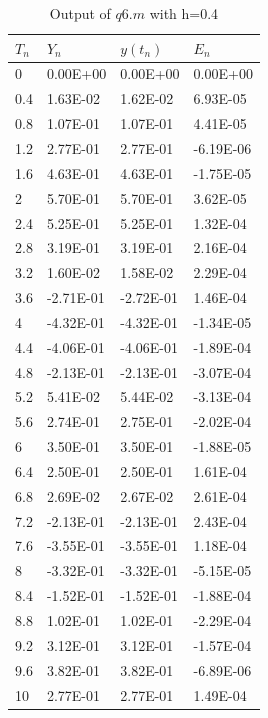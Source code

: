 \documentclass[10pt,a4paper]{report}
\begin{document}
\begin{minipage}[l]{0.45\linewidth}
\begin{table}[H]
\centering
\begin{tabular}{|l|l|l|l|}
\hline
$T_n$ & $Y_n$      & $y(t_n)$   & $E_n$      \\ \hline
0    & 0.00E+00  & 0.00E+00  & 0.00E+00  \\ \hline
0.4  & 1.63E-02  & 1.62E-02  & 6.93E-05  \\ \hline
0.8  & 1.07E-01  & 1.07E-01  & 4.41E-05  \\ \hline
1.2  & 2.77E-01  & 2.77E-01  & -6.19E-06 \\ \hline
1.6  & 4.63E-01  & 4.63E-01  & -1.75E-05 \\ \hline
2    & 5.70E-01  & 5.70E-01  & 3.62E-05  \\ \hline
2.4  & 5.25E-01  & 5.25E-01  & 1.32E-04  \\ \hline
2.8  & 3.19E-01  & 3.19E-01  & 2.16E-04  \\ \hline
3.2  & 1.60E-02  & 1.58E-02  & 2.29E-04  \\ \hline
3.6  & -2.71E-01 & -2.72E-01 & 1.46E-04  \\ \hline
4    & -4.32E-01 & -4.32E-01 & -1.34E-05 \\ \hline
4.4  & -4.06E-01 & -4.06E-01 & -1.89E-04 \\ \hline
4.8  & -2.13E-01 & -2.13E-01 & -3.07E-04 \\ \hline
5.2  & 5.41E-02  & 5.44E-02  & -3.13E-04 \\ \hline
5.6  & 2.74E-01  & 2.75E-01  & -2.02E-04 \\ \hline
6    & 3.50E-01  & 3.50E-01  & -1.88E-05 \\ \hline
6.4  & 2.50E-01  & 2.50E-01  & 1.61E-04  \\ \hline
6.8  & 2.69E-02  & 2.67E-02  & 2.61E-04  \\ \hline
7.2  & -2.13E-01 & -2.13E-01 & 2.43E-04  \\ \hline
7.6  & -3.55E-01 & -3.55E-01 & 1.18E-04  \\ \hline
8    & -3.32E-01 & -3.32E-01 & -5.15E-05 \\ \hline
8.4  & -1.52E-01 & -1.52E-01 & -1.88E-04 \\ \hline
8.8  & 1.02E-01  & 1.02E-01  & -2.29E-04 \\ \hline
9.2  & 3.12E-01  & 3.12E-01  & -1.57E-04 \\ \hline
9.6  & 3.82E-01  & 3.82E-01  & -6.89E-06 \\ \hline
10   & 2.77E-01  & 2.77E-01  & 1.49E-04  \\ \hline
\end{tabular}
\caption{Output of $q6.m$ with h=0.4}
\end{table}
\end{minipage}%
\end{document}
